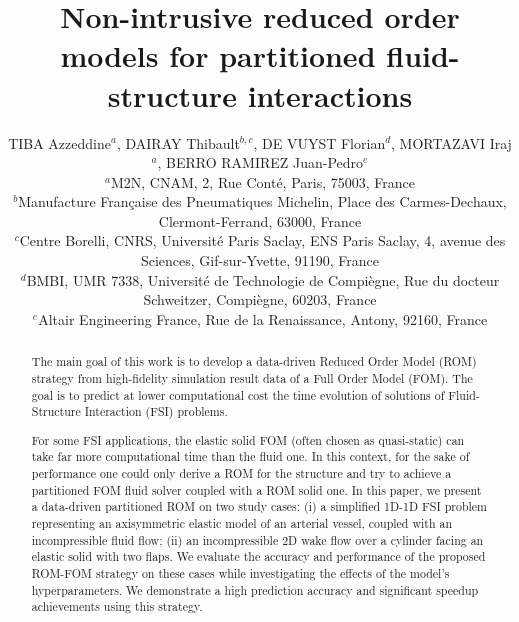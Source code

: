 \documentclass[11pt]{article}
\begin{document}
\title{Non-intrusive reduced order models for partitioned fluid-structure interactions}

\author{
TIBA Azzeddine$^{a}$,
DAIRAY Thibault$^{b,c}$,
DE VUYST Florian$^{d}$,
MORTAZAVI Iraj$^{a}$,
BERRO RAMIREZ Juan-Pedro$^{e}$\\[0.5em]
\small $^{a}$M2N, CNAM, 2, Rue Cont\'e, Paris, 75003, France\\
\small $^{b}$Manufacture Fran\c{c}aise des Pneumatiques Michelin, Place des Carmes-Dechaux, Clermont-Ferrand, 63000, France\\
\small $^{c}$Centre Borelli, CNRS, Universit\'e Paris Saclay, ENS Paris Saclay, 4, avenue des Sciences, Gif-sur-Yvette, 91190, France\\
\small $^{d}$BMBI, UMR 7338, Universit\'e de Technologie de Compi\`egne, Rue du docteur Schweitzer, Compi\`egne, 60203, France\\
\small $^{e}$Altair Engineering France, Rue de la Renaissance, Antony, 92160, France
}

\date{}

\maketitle

\begin{abstract}
The main goal of this work is to develop a data-driven Reduced Order Model (ROM) strategy from high-fidelity simulation result data of a Full Order Model (FOM). The goal is to predict at lower computational cost the time evolution of solutions of Fluid-Structure Interaction (FSI) problems.

For some FSI applications, the elastic solid FOM (often chosen as quasi-static) can take far more computational time than the fluid one. In this context, for the sake of performance one could only derive a ROM for the structure and try to achieve a partitioned FOM fluid solver coupled with a ROM solid one. In this paper, we present a data-driven partitioned ROM on two study cases: (i) a simplified 1D-1D FSI problem representing an axisymmetric elastic model of an arterial vessel, coupled with an incompressible fluid flow; (ii) an incompressible 2D wake flow over a cylinder facing an elastic solid with two flaps. We evaluate the accuracy and performance of the proposed ROM-FOM strategy on these cases while investigating the effects of the model's hyperparameters. We demonstrate a high prediction accuracy and significant speedup achievements using this strategy.
\end{abstract}
\end{document}
